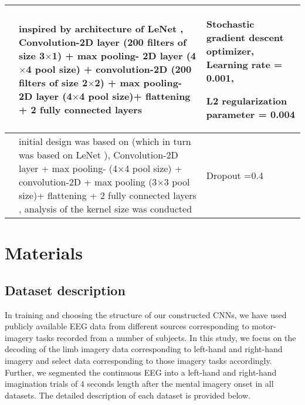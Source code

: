 \documentclass{ieeeaccess}
\begin{document}
\begin{table*}
\begin{tabular}{|p{0.6cm}|p{9cm}|p{5cm}|}
            \cite{zhang2019novelx} &  inspired by architecture of LeNet \cite{lecun1998gradient},  Convolution-2D layer (200 filters of  size 3$\times$1) + max pooling- 2D layer (4$\times$4 pool size) + convolution-2D (200 filters of  size 2$\times$2) + max pooling- 2D layer (4$\times$4 pool size)+ flattening + 2 fully connected layers & Stochastic gradient descent optimizer, Learning rate = 0.001,\par L2 regularization parameter = 0.004\\
            \hline
            
            \cite{ortiz2019new} & initial design was based on \cite{zhang2019novelx} (which in turn was based on LeNet \cite{lecun1998gradient}), Convolution-2D layer + max pooling- (4$\times$4 pool size) + convolution-2D  + max pooling (3$\times$3 pool size)+ flattening + 2 fully connected layers , analysis of the kernel size was conducted & Dropout =0.4 \\
            \hline    
        \end{tabular}
        \label{tab1}    
    \end{table*}      
    
    \section{Materials}
    \subsection{Dataset description}
    \label{sec:matmethods}
    In training and choosing the structure of our constructed CNNs, we have used publicly available EEG data from different sources corresponding to motor-imagery tasks recorded from a number of subjects. In this study, we focus on the decoding of the limb imagery data corresponding to left-hand and right-hand imagery and select data corresponding to those imagery tasks accordingly.  {Further, we segmented the continuous EEG into a left-hand and right-hand imagination trials of $4$ seconds length after the mental imagery onset in all datasets.} The detailed description of each dataset is provided below.  

    
\end{document}
